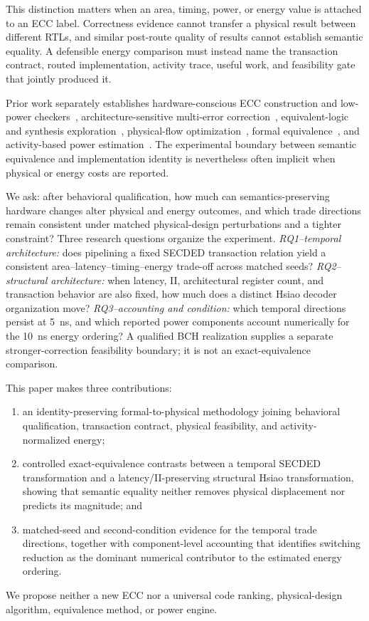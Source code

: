 \documentclass[conference,10pt]{IEEEtran}
\begin{document}
This distinction matters when an area, timing, power, or energy value is attached to an ECC label. Correctness evidence cannot transfer a physical result between different RTLs, and similar post-route quality of results cannot establish semantic equality. A defensible energy comparison must instead name the transaction contract, routed implementation, activity trace, useful work, and feasibility gate that jointly produced it.

Prior work separately establishes hardware-conscious ECC construction and low-power checkers~\cite{hsiao1970,ghosh2004,reviriego2013,tripathi2020}, architecture-sensitive multi-error correction~\cite{naseer2008,chen2004,wong2011,yoo2016,lagendijk2026}, equivalent-logic and synthesis exploration~\cite{mishchenko2006,hosny2020,neto2019,grosnit2022}, physical-flow optimization~\cite{kwon2019,ajayi2019,shalan2020}, formal equivalence~\cite{kuehlmann1997,kuehlmann2002}, and activity-based power estimation~\cite{najm1993,najm1994}. The experimental boundary between semantic equivalence and implementation identity is nevertheless often implicit when physical or energy costs are reported.

We ask: after behavioral qualification, how much can semantics-preserving hardware changes alter physical and energy outcomes, and which trade directions remain consistent under matched physical-design perturbations and a tighter constraint? Three research questions organize the experiment. \emph{RQ1--temporal architecture:} does pipelining a fixed SECDED transaction relation yield a consistent area--latency--timing--energy trade-off across matched seeds? \emph{RQ2--structural architecture:} when latency, II, architectural register count, and transaction behavior are also fixed, how much does a distinct Hsiao decoder organization move? \emph{RQ3--accounting and condition:} which temporal directions persist at 5~ns, and which reported power components account numerically for the 10~ns energy ordering? A qualified BCH realization supplies a separate stronger-correction feasibility boundary; it is not an exact-equivalence comparison.

This paper makes three contributions:
\begin{enumerate}
\item an identity-preserving formal-to-physical methodology joining behavioral qualification, transaction contract, physical feasibility, and activity-normalized energy;
\item controlled exact-equivalence contrasts between a temporal SECDED transformation and a latency/II-preserving structural Hsiao transformation, showing that semantic equality neither removes physical displacement nor predicts its magnitude; and
\item matched-seed and second-condition evidence for the temporal trade directions, together with component-level accounting that identifies switching reduction as the dominant numerical contributor to the estimated energy ordering.
\end{enumerate}
We propose neither a new ECC nor a universal code ranking, physical-design algorithm, equivalence method, or power engine.
\end{document}
